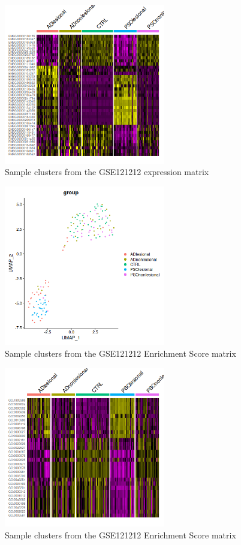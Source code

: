 \documentclass[aps,prb,twocolumn,superscriptaddress,floatfix,longbibliography]{revtex4-2}
\begin{document}
\begin{figure}[H]
\centering
\includegraphics[clip=true,width=7cm]{img/GSE121212-expr-heatmap.png}
\caption{Sample clusters from the GSE121212 expression matrix}
\label{fig:chunkedgsea}
\end{figure}

\begin{figure}[H]
\centering
\includegraphics[clip=true,width=7cm]{img/GSE121212-ES-clusters.png}
\caption{Sample clusters from the GSE121212 Enrichment Score matrix}
\label{fig:chunkedgsea}
\end{figure}

\begin{figure}[H]
\centering
\includegraphics[clip=true,width=7cm]{img/GSE121212-ES-heatmap.png}
\caption{Sample clusters from the GSE121212 Enrichment Score matrix}
\label{fig:chunkedgsea}
\end{figure}
\end{document}
